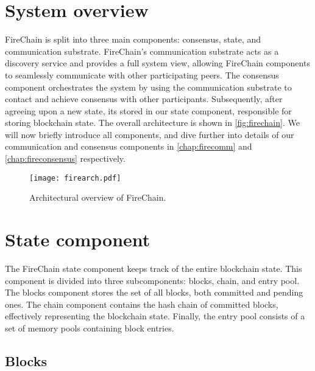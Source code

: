 \documentclass[USenglish]{uit-thesis}
\begin{document}
\newpage
\section{System overview}
FireChain is split into three main components: consensus, state, and communication substrate.
FireChain's communication substrate acts as a discovery service and provides a full system view, allowing FireChain components to seamlessly communicate with other participating peers. 
The consensus component orchestrates the system by using the communication substrate to contact and achieve consensus with other participants.
Subsequently, after agreeing upon a new state, its stored in our state component, responsible for storing blockchain state.
The overall architecture is shown in \autoref{fig:firechain}.
We will now briefly introduce all components, and dive further into details of our communication and consensus components in \autoref{chap:firecomm} and \autoref{chap:fireconsensus} respectively.

\begin{figure}[H]
	\centering
	\texttt{[image: firearch.pdf]}
	\caption{Architectural overview of FireChain.}
	\label{fig:firechain}
\end{figure}




\section{State component}
The FireChain state component keeps track of the entire blockchain state.
This component is divided into three subcomponents: blocks, chain, and entry pool.
The blocks component stores the set of all blocks, both committed and pending ones.
The chain component contains the hash chain of committed blocks, effectively representing the blockchain state.
Finally, the entry pool consists of a set of memory pools containing block entries.


\subsection{Blocks}
\end{document}
